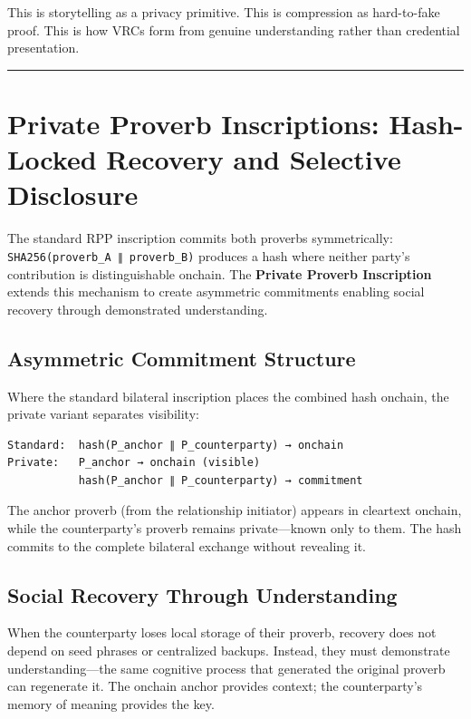 \documentclass[
]{article}
\begin{document}
This is storytelling as a privacy primitive. This is compression as
hard-to-fake proof. This is how VRCs form from genuine understanding
rather than credential presentation.

\begin{center}\rule{0.5\linewidth}{0.5pt}\end{center}

\section{Private Proverb Inscriptions: Hash-Locked Recovery and
Selective
Disclosure}\label{private-proverb-inscriptions-hash-locked-recovery-and-selective-disclosure}

The standard RPP inscription commits both proverbs symmetrically:
\texttt{SHA256(proverb\_A\ ∥\ proverb\_B)} produces a hash where neither
party's contribution is distinguishable onchain. The \textbf{Private
Proverb Inscription} extends this mechanism to create asymmetric
commitments enabling social recovery through demonstrated understanding.

\subsection{Asymmetric Commitment
Structure}\label{asymmetric-commitment-structure}

Where the standard bilateral inscription places the combined hash
onchain, the private variant separates visibility:

\begin{verbatim}
Standard:  hash(P_anchor ∥ P_counterparty) → onchain
Private:   P_anchor → onchain (visible)
           hash(P_anchor ∥ P_counterparty) → commitment
\end{verbatim}

The anchor proverb (from the relationship initiator) appears in
cleartext onchain, while the counterparty's proverb remains
private---known only to them. The hash commits to the complete bilateral
exchange without revealing it.

\subsection{Social Recovery Through
Understanding}\label{social-recovery-through-understanding}

When the counterparty loses local storage of their proverb, recovery
does not depend on seed phrases or centralized backups. Instead, they
must demonstrate understanding---the same cognitive process that
generated the original proverb can regenerate it. The onchain anchor
provides context; the counterparty's memory of meaning provides the key.
\end{document}

